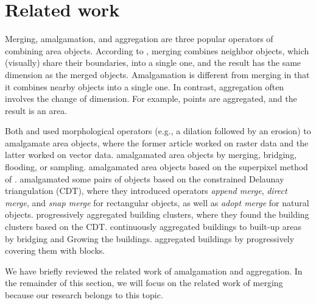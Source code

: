 \documentclass[twocolumn]{svjour3}          %
\begin{document}
\section{Related work}
\label{sec:related_work}



Merging, amalgamation, and aggregation  
are three popular operators of combining area objects. 
According to \citet{Shea1989Digital},
merging combines neighbor objects, 
which (visually) share their boundaries, into a single one,
and the result has the same dimension as the merged objects.
Amalgamation is different from merging in that 
it combines nearby objects into a single one.
In contrast, aggregation often involves the change of dimension.
For example, points are aggregated, and the result is an area.


Both \citet{Su1997aggregation} and \citet{Sester2005Optimization} 
used morphological operators (e.g., a dilation followed by an erosion)
to amalgamate area objects, 
where the former article worked on raster data and 
the latter worked on vector data.
\citet{Regnauld2003Amalgamation} 
amalgamated area objects
by merging, bridging, flooding, or sampling. 
\citet{Shen2019Aggregation} amalgamated area objects
based on the superpixel method of \citet{Achanta2012SLIC}.
\citet{Ware1995Areal} amalgamated some pairs of objects 
based on the constrained Delaunay triangulation (CDT),
where they introduced operators 
\emph{append merge}, \emph{direct merge}, and \emph{snap merge}
for rectangular objects, as well as \emph{adopt merge} for natural objects. 
\citet{Ai2007Aggregation} progressively aggregated building clusters,
where they found the building clusters based on the CDT.
\citet{Peng2017Building} continuously aggregated buildings to built-up areas 
by bridging and Growing the buildings.
\citet{Touya2017Progressive} aggregated buildings 
by progressively covering them with blocks.

We have briefly 
reviewed the related work of amalgamation and aggregation.
In the remainder of this section, 
we will focus on the related work of merging
because our research belongs to this topic.





\end{document}
